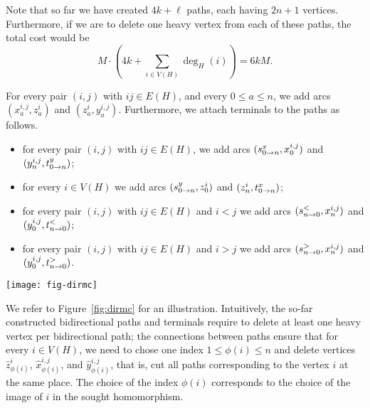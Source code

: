 Note that so far we have created $4k + \ell$ paths, each having $2n+1$ vertices.
Furthermore, if we are to delete one heavy vertex from each of these paths,
the total cost would be
$$M \cdot \left(4k + \sum_{i \in V(H)} \deg_H(i)\right) = 6kM.$$

For every pair $(i,j)$ with $ij \in E(H)$,
and every $0 \leq a \leq n$, we add arcs $(x^{i,j}_a,z^i_a)$ and $(z^i_a,y^{i,j}_a)$. Furthermore, we attach terminals to the paths as follows.
\begin{itemize}
\item for every pair $(i,j)$ with $ij \in E(H)$,
we add arcs $(s_{0 \to n}^{x},x^{i,j}_0)$ and $(y^{i,j}_n,t_{0 \to n}^{y})$;
\item for every $i \in V(H)$ we add arcs $(s_{0 \to n}^{y},z^i_0)$ and $(z^i_n,t_{0 \to n}^{x})$; \item for every pair $(i,j)$ with $ij \in E(H)$ and $i<j$ we add arcs $(s_{n \to 0}^{<}, x^{i,j}_n)$ and $(y^{i,j}_0,t_{n \to 0}^{<})$;
\item for every pair $(i,j)$ with $ij \in E(H)$ and $i > j$
we add arcs $(s_{n \to 0}^{>}, x^{i,j}_n)$ and $(y^{i,j}_0,t_{n \to 0}^{>})$.
\end{itemize}

\begin{figure*}[tb]
\begin{center}
\texttt{[image: fig-dirmc]}
\caption{Illustration of the reduction for \dirmc{}. Black vertices are light, gray are heavy, and white are undeletable.
The top figure illustates a $p$-grid, together with an intended solution marked by red circles.
Here, the vertex $p_{1,1}$ lies in the top-left corner of the grid, the first coordinate describes the row of the grid,
and the second one the column.
The bottom figure illustrates an $x$-, $z$-, and $y$-path for a pair $(i,j)$ with $ij \in E(H)$ and $i < j$.}
\label{fig:dirmc}
\end{center}
\end{figure*}

We refer to Figure~\ref{fig:dirmc} for an illustration.
Intuitively, the so-far constructed bidirectional paths and terminals require to delete at least one heavy vertex per 
bidirectional path; the connections between paths ensure that for every $i \in V(H)$, we need to chose
one index $1 \leq \phi(i) \leq n$ and delete vertices $\hat{z}^i_{\phi(i)}$, $\hat{x}^{i,j}_{\phi(i)}$, and $\hat{y}^{i,j}_{\phi(i)}$, that is, cut all paths corresponding to the vertex $i$ at the same place. The choice of the index $\phi(i)$ corresponds
to the choice of the image of $i$ in the sought homomorphism.

